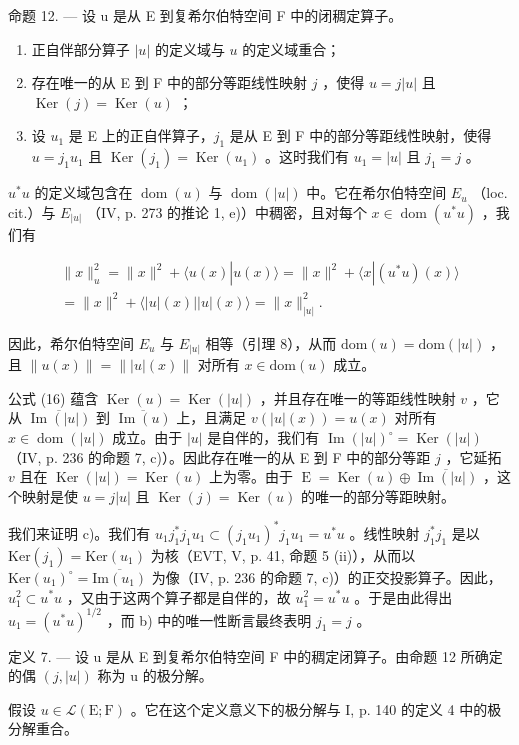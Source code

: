 命题 12. --- 设 u 是从 E 到复希尔伯特空间 F 中的闭稠定算子。

\begin{enumerate}
\def\labelenumi{\alph{enumi})}
\item
  正自伴部分算子 \(|u|\) 的定义域与 \(u\) 的定义域重合；
\item
  存在唯一的从 E 到 F 中的部分等距线性映射 \(j\) ，使得 \(u = j|u|\) 且 \(\operatorname{Ker}(j) = \operatorname{Ker}(u)\) ；
\item
  设 \(u_{1}\) 是 E 上的正自伴算子，\(j_{1}\) 是从 E 到 F 中的部分等距线性映射，使得 \(u = j_{1}u_{1}\) 且 \(\operatorname{Ker}(j_{1}) = \operatorname{Ker}(u_{1})\) 。这时我们有 \(u_{1} = |u|\) 且 \(j_{1} = j\) 。
\end{enumerate}

\(u^{*}u\) 的定义域包含在 \(\operatorname{dom}(u)\) 与 \(\operatorname{dom}(|u|)\) 中。它在希尔伯特空间 \(E_{u}\) （loc. cit.）与 \(E_{|u|}\) （IV, p. 273 的推论 1, e)）中稠密，且对每个 \(x \in \operatorname{dom}(u^{*}u)\) ，我们有

\[
\begin{array}{c} \| x \| _ {u} ^ {2} = \| x \| ^ {2} + \langle u (x) | u (x) \rangle = \| x \| ^ {2} + \langle x | (u ^ {*} u) (x) \rangle \\ = \| x \| ^ {2} + \langle | u | (x) | | u | (x) \rangle = \| x \| _ {| u |} ^ {2}. \end{array}\tag{16}
\]

因此，希尔伯特空间 \(E_{u}\) 与 \(E_{|u|}\) 相等（引理 8），从而 \(\text{dom}(u) = \text{dom}(|u|)\) ，且 \(\|u(x)\| = \||u|(x)\|\) 对所有 \(x \in \text{dom}(u)\) 成立。

公式 (16) 蕴含 \(\operatorname{Ker}(u) = \operatorname{Ker}(|u|)\) ，并且存在唯一的等距线性映射 \(v\) ，它从 \(\overline{\operatorname{Im}(|u|)}\) 到 \(\overline{\operatorname{Im}(u)}\) 上，且满足 \(v(|u|(x)) = u(x)\) 对所有 \(x \in \operatorname{dom}(|u|)\) 成立。由于 \(|u|\) 是自伴的，我们有 \(\operatorname{Im}(|u|)^{\circ} = \operatorname{Ker}(|u|)\) （IV, p. 236 的命题 7, c)）。因此存在唯一的从 E 到 F 中的部分等距 \(j\) ，它延拓 \(v\) 且在 \(\operatorname{Ker}(|u|) = \operatorname{Ker}(u)\) 上为零。由于 \(\operatorname{E} = \operatorname{Ker}(u) \oplus \overline{\operatorname{Im}(|u|)}\) ，这个映射是使 \(u = j|u|\) 且 \(\operatorname{Ker}(j) = \operatorname{Ker}(u)\) 的唯一的部分等距映射。

我们来证明 c)。我们有 \(u_{1}j_{1}^{*}j_{1}u_{1}\subset(j_{1}u_{1})^{*}j_{1}u_{1}=u^{*}u\) 。线性映射 \(j_{1}^{*}j_{1}\) 是以 \(\mathrm{Ker}(j_{1})=\mathrm{Ker}(u_{1})\) 为核（EVT, V, p. 41, 命题 5 (ii)），从而以 \(\mathrm{Ker}(u_{1})^{\circ}=\overline{\mathrm{Im}(u_{1})}\) 为像（IV, p. 236 的命题 7, c)）的正交投影算子。因此，\(u_{1}^{2}\subset u^{*}u\) ，又由于这两个算子都是自伴的，故 \(u_{1}^{2}=u^{*}u\) 。于是由此得出 \(u_{1}=(u^{*}u)^{1/2}\) ，而 b) 中的唯一性断言最终表明 \(j_{1}=j\) 。

定义 7. --- 设 u 是从 E 到复希尔伯特空间 F 中的稠定闭算子。由命题 12 所确定的偶 \((j, |u|)\) 称为 u 的极分解。

假设 \(u \in \mathcal{L}(\mathrm{E};\mathrm{F})\) 。它在这个定义意义下的极分解与 I, p. 140 的定义 4 中的极分解重合。


